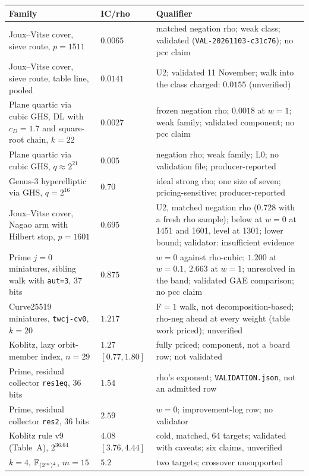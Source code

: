 \begin{table}[h]
\centering\small
\begin{tabularx}{\linewidth}{@{}>{\raggedright}p{3.9cm}l>{\raggedright\arraybackslash}X@{}}
\toprule
Family & IC/rho & Qualifier \\
\midrule
Joux--Vitse cover, sieve route, $p=1511$ & $0.0065$ & matched negation rho; weak class; validated (\texttt{VAL-20261103-c31c76}); no pcc claim \\
Joux--Vitse cover, sieve route, table line, pooled & $0.0141$ & U2; validated 11 November; walk into the class charged: $0.0155$ (unverified) \\
Plane quartic via cubic GHS, DL with $c_D=1.7$ and square-root chain, $k=22$ & $0.0027$ & frozen negation rho; $0.0018$ at $w=1$; weak family; validated component; no pcc claim \\
Plane quartic via cubic GHS, $q\approx2^{21}$ & $0.005$ & negation rho; weak family; L0; no validation file; producer-reported \\
Genus-3 hyperelliptic via GHS, $q=2^{16}$ & $0.70$ & ideal strong rho; one size of seven; pricing-sensitive; producer-reported \\
Joux--Vitse cover, Nagao arm with Hilbert stop, $p=1601$ & $0.695$ & U2, matched negation rho ($0.728$ with a fresh rho sample); below at $w=0$ at 1451 and 1601, level at 1301; lower bound; validator: insufficient evidence \\
Prime $j=0$ miniatures, sibling walk with \texttt{aut=3}, 37 bits & $0.875$ & $w=0$ against rho-cubic; $1.200$ at $w=0.1$, $2.663$ at $w=1$; unresolved in the band; validated GAE comparison; no pcc claim \\
Curve25519 miniatures, \texttt{twcj-cv0}, $k=20$ & $1.217$ & F$=1$ walk, not decomposition-based; rho-neg ahead at every weight (table work priced); unverified \\
Koblitz, lazy orbit-member index, $n=29$ & $1.27$ $[0.77,1.80]$ & fully priced; component, not a board row; not validated \\
Prime, residual collector \texttt{res1eq}, 36 bits & $1.54$ & rho's exponent; \texttt{VALIDATION.json}, not an admitted row \\
Prime, residual collector \texttt{res2}, 36 bits & $2.59$ & $w=0$; improvement-log row; no validator \\
Koblitz rule v9 (Table~A), $2^{36.64}$ & $4.08$ $[3.76,4.44]$ & cold, matched, 64 targets; validated with caveats; six claims, unverified \\
$k=4$, $\mathbb{F}_{(2^m)^4}$, $m=15$ & $5.2$ & two targets; crossover unsupported \\

\end{tabularx}
\end{table}
